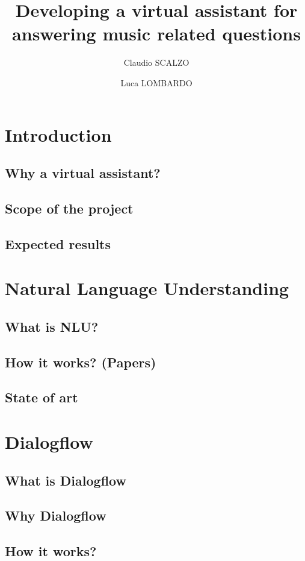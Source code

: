 \documentclass[a4paper,12pt]{report}
\title{Developing a virtual assistant for answering music related questions}
\author{Claudio SCALZO \and Luca LOMBARDO}
\begin{document}
\maketitle
\tableofcontents

\chapter{Introduction}
	\section{Why a virtual assistant?}
	\section{Scope of the project}
	\section{Expected results}

\chapter{Natural Language Understanding}
	\section{What is NLU?}
	\section{How it works? (Papers)}
	\section{State of art}

\chapter{Dialogflow}
	\section{What is Dialogflow}
	\section{Why Dialogflow}
	\section{How it works?}
\end{document}
